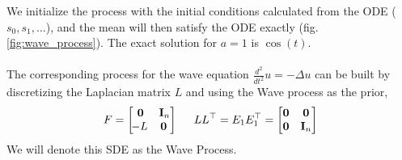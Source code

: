 {    We initialize the process with the initial conditions calculated from the ODE ($s_0, s_1, \dots$), and the mean will then satisfy the ODE exactly (fig. \ref{fig:wave_process}). The exact solution for $a=1$ is $\cos(t)$.
    \\
    \\
    The corresponding process for the wave equation $\frac{d^2}{dt^2}u = -\Delta u$ can be built by discretizing the Laplacian matrix $L$ and using the Wave process as the prior, 
    $$F = \begin{bmatrix}
    \mathbf{0} &  \textbf{I}_n  \\ \!-L & \! \mathbf{0}
    \end{bmatrix} \hspace*{5mm} LL^\top = E_1E_1^\top = \begin{bmatrix}
    \mathbf{0} & \mathbf{0} \\ \mathbf{0} & \textbf{I}_n \end{bmatrix}$$
    We will denote this SDE as the Wave Process.
}
